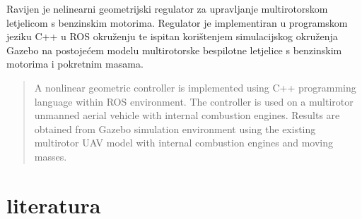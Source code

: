 \documentclass[times, utf8, diplomski]{fer}
\begin{document}



\begin{sazetak}
Ravijen je nelinearni geometrijski regulator za upravljanje multirotorskom letjelicom s benzinskim motorima. Regulator je implementiran u programskom jeziku C++ u ROS okruženju te ispitan korištenjem simulacijskog okruženja Gazebo na postojećem modelu multirotorske bespilotne letjelice s benzinskim motorima i pokretnim masama.

\end{sazetak}

\begin{abstract}
A nonlinear geometric controller is implemented using C++ programming language within ROS environment. The controller is used on a multirotor unmanned aerial vehicle with internal combustion engines. Results are obtained from Gazebo simulation environment using the existing multirotor UAV model with internal combustion engines and moving masses.

\end{abstract}

\chapter{literatura}
\end{document}
